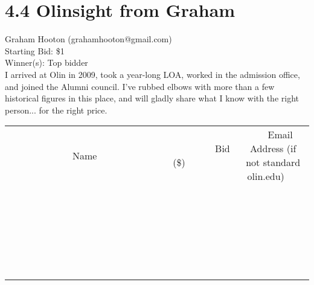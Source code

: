 \documentclass[11pt]{article}
\begin{document}
\section*{4.4 Olinsight from Graham}
Graham Hooton (grahamhooton@gmail.com) \\
Starting Bid: \$1 \\
Winner(s): 
Top bidder \\
I arrived at Olin in 2009, took a year-long LOA, worked in the admission office, and joined the Alumni council. I've rubbed elbows with more than a few historical figures in this place, and will gladly share what I know with the right person... for the right price. \\[6ex]
\begin{tabular}{c c c}
~~~~~~~~~~~~~Name~~~~~~~~~~~~~ & ~~~~~~~~~Bid (\$)~~~~~~~~~ & ~~~Email Address (if not standard olin.edu)~~~ \\
 & & \\
\hline
 & & \\
\hline
 & & \\
\hline
 & & \\
\hline
 & & \\
\hline
 & & \\
\hline
 & & \\
\hline
 & & \\
\hline
 & & \\
\hline
 & & \\
\hline
 & & \\
\hline
 & & \\
\hline
 & & \\
\hline
 & & \\
\hline
 & & \\
\hline
 & & \\
\hline
 & & \\
\hline
 & & \\
\hline
 & & \\
\hline
 & & \\
\hline
 & & \\
\hline
 & & \\
\hline
 & & \\
\hline
 & & \\
\hline
 & & \\
\hline
 & & \\
\hline
\end{tabular}
\clearpage
\end{document}
